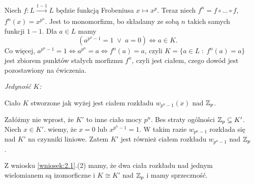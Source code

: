 Niech $f:L\xrightarrow[]{1-1}L$ będzie funkcją Frobeniusa $x\mapsto x^p$. Teraz niech $f^n=f\circ...\circ f$, $f^n(x)=x^{p^n}$. Jest to monomorfizm, bo składamy ze sobą $n$ takich samych funkcji $1-1$. Dla $a\in L$ mamy 
$$(a^{p^n-1}=1\;\lor\;a=0)\iff a\in K.$$
Co więcej, $a^{p^n-1}=1\iff a^{p^n}=a\iff f^n(a)=a$, czyli $K=\{a\in L\;:\;f^n(a)=a\}$ jest zbiorem punktów stałych morfizmu $f^n$, czyli jest ciałem, czego dowód jest pozostawiony na ćwiczenia. 

\emph{Jedyność $K$:}

Ciało $K$ stworzone jak wyżej jest ciałem rozkładu $w_{p^n-1}(x)$ nad $\mathbb{Z}_p$. 

Załóżmy nie wprost, że $K'$ to inne ciało mocy $p^n$. Bes straty ogólności $\mathbb{Z}_p\subseteq K'$. Niech $x\in K'$. wiemy, że $x=0$ lub $x^{p^n-1}=1$. W takim razie $w_{p^n-1}$ rozkłada się nad $K'$ na czynniki liniowe. Zatem $K'$ jest również ciałem rozkładu $w_{p^n-1}$ nad $\mathbb{Z}_p$.

Z wniosku \ref{wniosek:2.1}.(2) mamy, że dwa ciała rozkładu nad jednym wielomianem są izomorficzne i $K\cong K'$ nad $\mathbb{Z}_p$ i mamy sprzeczność.
